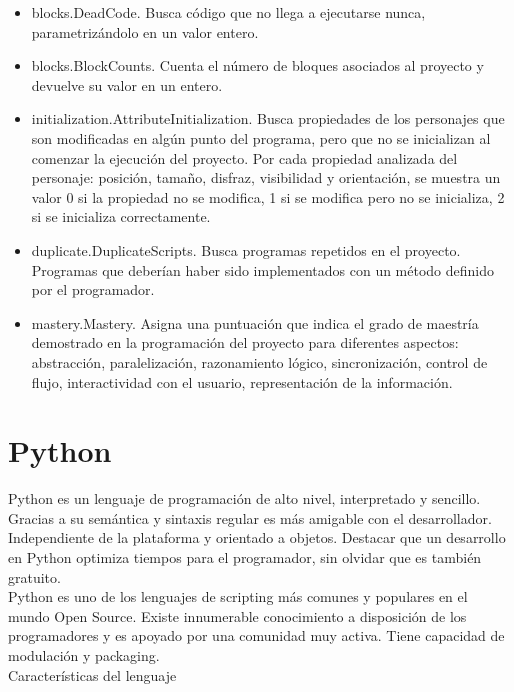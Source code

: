 \documentclass[a4paper, 12pt]{book}
\begin{document}
\begin{itemize}
  \item blocks.DeadCode.
  Busca código que no llega a ejecutarse nunca, parametrizándolo en un valor entero.
  \item blocks.BlockCounts.
  Cuenta el número de bloques asociados al proyecto y devuelve su valor en un entero.
  \item initialization.AttributeInitialization.
  Busca propiedades de los personajes que son modificadas en algún punto del programa,
  pero que no se inicializan al comenzar la 	ejecución del proyecto. Por cada propiedad
  analizada del personaje: posición, tamaño, 	disfraz, visibilidad y orientación, se
  muestra un valor 0 si la propiedad no se modifica, 	1 si se modifica pero no se inicializa,
  2 si se inicializa correctamente.
  \item duplicate.DuplicateScripts.
  Busca programas repetidos en el proyecto. Programas que deberían haber sido implementados
  con un método definido por el programador.
  \item mastery.Mastery.
  Asigna una puntuación que indica el grado de maestría demostrado en la programación del
  proyecto para diferentes aspectos: abstracción, paralelización, razonamiento lógico,
  sincronización, control de flujo, interactividad con el usuario, representación de la información.
	
	
\end{itemize}


\section{Python}
\label{sec:seccion4}

Python es un lenguaje de programación de alto nivel, interpretado y sencillo. Gracias a su 
semántica y sintaxis regular es más amigable con el desarrollador. Independiente
de la plataforma y orientado a objetos. Destacar que un desarrollo en Python optimiza tiempos para
el programador, sin olvidar que es también gratuito. \\

Python es uno de los lenguajes de scripting más comunes y populares en el mundo Open Source. Existe
innumerable conocimiento a disposición de los programadores y es apoyado por una comunidad muy
activa. Tiene capacidad de modulación y packaging. \\


Características del lenguaje
\end{document}
